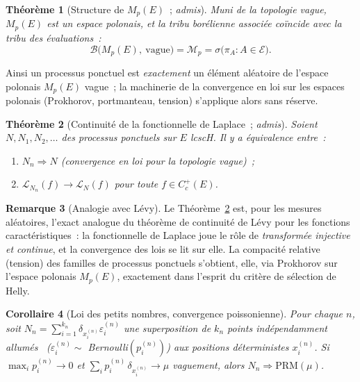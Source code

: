 \documentclass[11pt,a4paper]{article}
\providecommand{\og}{\guillemotleft\,}\providecommand{\fg}{\,\guillemotright}
\theoremstyle{plain}
\newtheorem{theoreme}{Théorème}[section]
\newtheorem{corollaire}[theoreme]{Corollaire}
\theoremstyle{definition}
\newtheorem{remarque}[theoreme]{Remarque}
\newcommand{\Mp}{M_p}
\newcommand{\calE}{\mathcal{E}}
\newcommand{\calM}{\mathcal{M}}
\newcommand{\calB}{\mathcal{B}}
\newcommand{\calL}{\mathcal{L}}
\begin{document}
\begin{theoreme}[Structure de $\Mp(E)$~; \emph{admis}]\label{thm:polish}
Muni de la topologie vague, $\Mp(E)$ est un espace polonais, et la tribu borélienne associée coïncide avec la tribu des évaluations~:
\[
\calB\big(\Mp(E),\ \text{vague}\big)=\calM_p=\sigma\big(\pi_A:A\in\calE\big).
\]
\end{theoreme}

Ainsi un processus ponctuel est \emph{exactement} un élément aléatoire de l'espace polonais $\Mp(E)$ vague~; la machinerie de la convergence en loi sur les espaces polonais (Prokhorov, portmanteau, tension) s'applique alors sans réserve.

\begin{theoreme}[Continuité de la fonctionnelle de Laplace~; \emph{admis}]\label{thm:cv-laplace}
Soient $N,N_1,N_2,\dots$ des processus ponctuels sur $E$ lcscH. Il y a équivalence entre~:
\begin{enumerate}[label=\textup{(\roman*)}]
\item $N_n\Rightarrow N$ \textup{(convergence en loi pour la topologie vague)}~;
\item $\calL_{N_n}(f)\longrightarrow \calL_{N}(f)$ pour toute $f\in C_c^+(E)$.
\end{enumerate}
\end{theoreme}

\begin{remarque}[Analogie avec Lévy]
Le Théorème~\ref{thm:cv-laplace} est, pour les mesures aléatoires, l'exact analogue du théorème de continuité de Lévy pour les fonctions caractéristiques~: la fonctionnelle de Laplace joue le rôle de \emph{transformée injective et continue}, et la convergence des lois se lit sur elle. La compacité relative (tension) des familles de processus ponctuels s'obtient, elle, via Prokhorov sur l'espace polonais $\Mp(E)$, exactement dans l'esprit du critère de sélection de Helly.
\end{remarque}

\begin{corollaire}[Loi des petits nombres, convergence poissonienne]
Pour chaque $n$, soit $N_n=\sum_{i=1}^{k_n}\delta_{x^{(n)}_i}\varepsilon^{(n)}_i$ une superposition de $k_n$ points indépendamment \og allumés \fg{} ($\varepsilon^{(n)}_i\sim$ Bernoulli$(p^{(n)}_i)$) aux positions déterministes $x^{(n)}_i$. Si $\max_i p^{(n)}_i\to0$ et $\sum_i p^{(n)}_i\,\delta_{x^{(n)}_i}\to\mu$ vaguement, alors $N_n\Rightarrow \mathrm{PRM}(\mu)$.
\end{corollaire}
\end{document}

